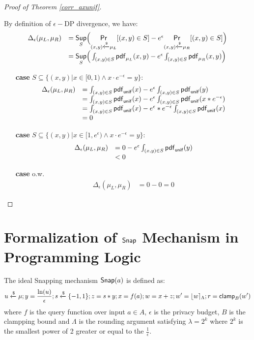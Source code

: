 \documentclass[a4paper,11pt]{article}
\begin{document}
\begin{proof}[Proof of Theorem \ref{corr_axunif}]
\begin{itemize}
	By definition of $\epsilon-$DP divergence, we have:
	 \[
	 \begin{array}{ll}
	 \Delta_{\epsilon}(\mu_L, \mu_R) 
	 & = \underset{S}{\mathsf{Sup}}
	 \Big(
	 \underset{(x,y) \xleftarrow{\$} \mu_L}{\mathsf{Pr}}[(x,y) \in S] - e^{\epsilon} \underset{(x,y) \xleftarrow{\$} \mu_R}{\mathsf{Pr}}[(x,y) \in S]
	 \Big) \\
	 & =\underset{S}{\mathsf{Sup}}
	 \Big(
	 \int_{(x,y) \in S} \mathsf{pdf}_{\mu_L}(x, y) - e^{\epsilon} \int_{(x,y) \in S} \mathsf{pdf}_{\mu_R}(x, y)
	 \Big)	 
	 \end{array}
	 \]
	 \begin{itemize}
	 	\item[{\bf case}] $S \subseteq \{(x, y) | x \in [0, 1) \land x \cdot e^{-\epsilon} = y\}$:\\
		 \[
		 \begin{array}{ll}
		 \Delta_{\epsilon}(\mu_L, \mu_R) 
		 & = 
		 \int_{(x,y) \in S} \mathsf{pdf}_{\mathsf{unif}}(x) - e^{\epsilon} \int_{(x,y) \in S} \mathsf{pdf}_{\mathsf{unif}}(y)\\
		 & = 
		 \int_{(x,y) \in S} \mathsf{pdf}_{\mathsf{unif}}(x) - e^{\epsilon} \int_{(x,y) \in S} \mathsf{pdf}_{\mathsf{unif}}(x * e^{-\epsilon})\\ 
		 & = 
		 \int_{(x,y) \in S} \mathsf{pdf}_{\mathsf{unif}}(x) - e^{\epsilon}* e^{-\epsilon} \int_{(x,y) \in S} \mathsf{pdf}_{\mathsf{unif}}(x )\\
		 & = 0 
		 \end{array}
		 \]
	 	\item[{\bf case}] $S \subseteq \{(x, y) | x \in [1, e^{\epsilon}) \land x \cdot e^{-\epsilon} = y\}$:\\
		 \[
		 \begin{array}{ll}
		 \Delta_{\epsilon}(\mu_L, \mu_R) 
		 & = 
		 0 - e^{\epsilon} \int_{(x,y) \in S} \mathsf{pdf}_{\mathsf{unif}}(y)\\
		 & <  0 
		 \end{array}
		 \]
	 	\item[{\bf case}] o.w.\\
		 \[
		 \begin{array}{ll}
		 \Delta_{\epsilon}(\mu_L, \mu_R) 
		 & = 0 - 0 =  0 
		 \end{array}
		 \]	 	

	 \end{itemize}

\end{itemize}
\end{proof}

\section{Formalization of $\mathsf{Snap}$ Mechanism in Programming Logic}
\begin{defn}
The ideal Snapping mechanism $\mathsf{Snap}( a)$ is defined as:
\[
	u \xleftarrow{\$} \mu; y = \frac{\ln (u)}{\epsilon}; s \xleftarrow{\$} \{-1, 1\}; z = s * y; x = f(a); w = x + z; w' = \lfloor w \rceil_{\Lambda}; r = \mathsf{clamp}_B (w')
\]
where $f$ is the query function over input $a \in A$, $\epsilon$ is the privacy budget, $B$ is the clampping bound and $\Lambda$ is the rounding argument satisfying $\lambda = 2^k$ where $2^k$ is the smallest power of 2 greater or equal to the $\frac{1}{\epsilon}$.
\end{defn}
\end{document}
